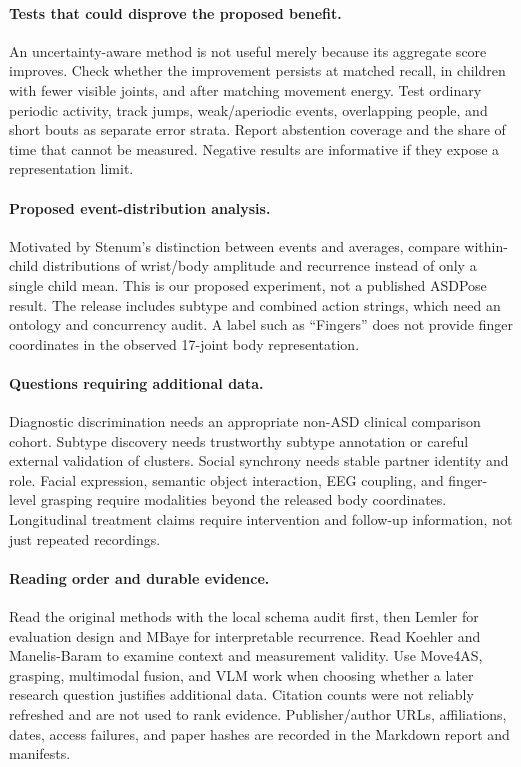 \paragraph{Tests that could disprove the proposed benefit.}
An uncertainty-aware method is not useful merely because its aggregate score
improves. Check whether the improvement persists at matched recall, in children
with fewer visible joints, and after matching movement energy. Test ordinary
periodic activity, track jumps, weak/aperiodic events, overlapping people, and
short bouts as separate error strata. Report abstention coverage and the share
of time that cannot be measured. Negative results are informative if they expose
a representation limit.

\paragraph{Proposed event-distribution analysis.}
Motivated by Stenum's distinction between events and averages, compare
within-child distributions of wrist/body amplitude and recurrence instead of
only a single child mean. This is our proposed experiment, not a published
ASDPose result. The release includes subtype and combined action strings, which
need an ontology and concurrency audit. A label such as ``Fingers'' does not
provide finger coordinates in the observed 17-joint body representation.

\paragraph{Questions requiring additional data.}
Diagnostic discrimination needs an appropriate non-ASD clinical comparison
cohort. Subtype discovery needs trustworthy subtype annotation or careful
external validation of clusters. Social synchrony needs stable partner identity
and role. Facial expression, semantic object interaction, EEG coupling, and
finger-level grasping require modalities beyond the released body coordinates.
Longitudinal treatment claims require intervention and follow-up information,
not just repeated recordings.

\paragraph{Reading order and durable evidence.}
Read the original methods with the local schema audit first, then Lemler for
evaluation design and MBaye for interpretable recurrence. Read Koehler and
Manelis-Baram to examine context and measurement validity. Use Move4AS, grasping,
multimodal fusion, and VLM work when choosing whether a later research question
justifies additional data. Citation counts were not reliably refreshed and are
not used to rank evidence. Publisher/author URLs, affiliations, dates, access
failures, and paper hashes are recorded in the Markdown report and manifests.
